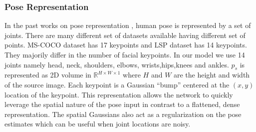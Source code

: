 \documentclass[conference]{IEEEtran}
\begin{document}
\subsubsection{Pose Representation}
In the past works on pose representation \cite{poseAE}, human pose is represented by a set of joints. There are many different set of datasets available having different set of points. MS-COCO dataset \cite{coco} has 17 keypoints and LSP dataset \cite{lsp} has 14 keypoints. They majorily differ in the number of facial keypoints. In our model we use 14 joints namely head, neck, shoulders, elbows, wrists,hips,knees and ankles. $p_{s}$ is represented as 2D volume in $\mathbb{R}^{H\times W\times 1}$ where $H$ and $W$ are the height and width of the source image. Each keypoint is a Gaussian ``bump'' centered at the $(x, y)$ location of the keypoint. This representation allows the network to quickly leverage the spatial nature of the pose input in contrast to a flattened, dense representation. The spatial Gaussians also act as a regularization on the pose estimates which can be useful when joint locations
are noisy.
\end{document}
